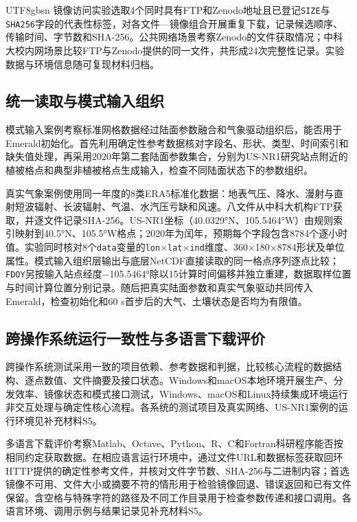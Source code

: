 \documentclass[numdoi]{chinese}
\begin{document}
\begin{CJK}{UTF8}{gbsn}
镜像访问实验选取4个同时具有FTP和Zenodo地址且已登记\nolinkurl{SIZE}与\nolinkurl{SHA256}字段的代表性标签，对各文件—镜像组合开展重复下载，记录候选顺序、传输时间、字节数和SHA-256。公共网络场景考察Zenodo的文件获取情况；中科大校内网场景比较FTP与Zenodo提供的同一文件，共形成24次完整性记录。实验数据与环境信息随可复现材料归档。

\subsection{统一读取与模式输入组织}
模式输入案例考察标准网格数据经过陆面参数融合和气象驱动组织后，能否用于Emerald初始化。首先利用确定性参考数据核对字段名、形状、类型、时间索引和缺失值处理，再采用2020年第二套陆面参数集合，分别为US-NR1研究站点附近的植被格点和典型非植被格点生成输入，检查不同陆面状态下的参数组织。

真实气象案例使用同一年度的8类ERA5标准化数据\cite{ref9}：地表气压、降水、漫射与直射短波辐射、长波辐射、气温、水汽压亏缺和风速。八文件从中科大机构FTP获取，并逐文件记录SHA-256。US-NR1坐标（40.0329°N、105.5464°W）由规则索引映射到40.5°N、105.5°W格点；2020年为闰年，预期每个字段包含8784个逐小时值。实验同时核对8个\nolinkurl{data}变量的\texttt{lon\ensuremath{\times}lat\ensuremath{\times}ind}维度、360\ensuremath{\times}180\ensuremath{\times}8784形状及单位属性。模式输入组织层输出与底层NetCDF直接读取的同一格点序列逐点比较；\nolinkurl{FDOY}另按输入站点经度\ensuremath{-}105.5464°除以15计算时间偏移并独立重建，数据取样位置与时间计算位置分别记录。随后把真实陆面参数和真实气象驱动共同传入Emerald，检查初始化和60 s首步后的大气、土壤状态是否均为有限值。

\subsection{跨操作系统运行一致性与多语言下载评价}
跨操作系统测试采用一致的项目依赖、参考数据和判据，比较核心流程的数据结构、逐点数值、文件摘要及接口状态。Windows和macOS本地环境开展生产、分发效率、镜像状态和模式接口测试，Windows、macOS和Linux持续集成环境运行非交互处理与确定性核心流程。各系统的测试项目及真实网络、US-NR1案例的运行环境见补充材料S5。

多语言下载评价考察Matlab、Octave、Python、R、C和Fortran科研程序能否按相同约定获取数据。在相应语言运行环境中，通过文件URL和数据标签获取回环HTTP提供的确定性参考文件，并核对文件字节数、SHA-256与二进制内容；首选镜像不可用、文件大小或摘要不符的情形用于检验镜像回退、错误返回和已有文件保留。含空格与特殊字符的路径及不同工作目录用于检查参数传递和接口调用。各语言环境、调用示例与结果记录见补充材料S5。


\end{CJK}
\end{document}
